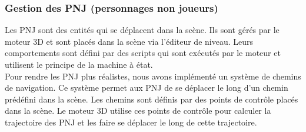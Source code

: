 \subsubsection{Gestion des PNJ (personnages non joueurs)}

Les PNJ sont des entités qui se déplacent dans la scène. Ils sont gérés par le moteur
3D et sont placés dans la scène via l'éditeur de niveau. Leurs comportements sont
défini par des scripts qui sont exécutés par le moteur et utilisent le principe
de la machine à état.\\

Pour rendre les PNJ plus réalistes, nous avons implémenté un système de chemins
de navigation. Ce système permet aux PNJ de se déplacer le long d'un chemin prédéfini
dans la scène. Les chemins sont définis par des points de contrôle placés dans
la scène. Le moteur 3D utilise ces points de contrôle pour calculer la trajectoire
des PNJ et les faire se déplacer le long de cette trajectoire.


